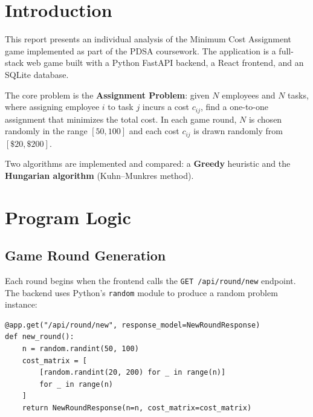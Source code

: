 \documentclass[12pt,a4paper]{article}
\begin{document}
\newpage
{}
\cfoot{\thepage}

\listoffigures
\newpage

\listoftables
\newpage

\tableofcontents
\newpage

\pagestyle{fancy}
\fancyhf{}
\renewcommand{\headrulewidth}{0pt}
\fancyfoot[R]{\thepage}

\section*{Introduction}

This report presents an individual analysis of the Minimum Cost Assignment game
implemented as part of the PDSA coursework. The application is a full-stack web
game built with a Python FastAPI backend, a React frontend, and an SQLite database.

The core problem is the \textbf{Assignment Problem}: given $N$ employees and $N$ tasks,
where assigning employee $i$ to task $j$ incurs a cost $c_{ij}$, find a one-to-one
assignment that minimizes the total cost. In each game round, $N$ is chosen randomly
in the range $[50, 100]$ and each cost $c_{ij}$ is drawn randomly from $[\$20, \$200]$.

Two algorithms are implemented and compared: a \textbf{Greedy} heuristic and the
\textbf{Hungarian algorithm} (Kuhn--Munkres method).

\clearpage
\section{Program Logic}

\subsection{Game Round Generation}

Each round begins when the frontend calls the \texttt{GET /api/round/new} endpoint.
The backend uses Python's \texttt{random} module to produce a random problem instance:

\needspace{7cm}
\begin{lstlisting}[caption={Game round generation -- backend/main.py}]
@app.get("/api/round/new", response_model=NewRoundResponse)
def new_round():
    n = random.randint(50, 100)
    cost_matrix = [
        [random.randint(20, 200) for _ in range(n)]
        for _ in range(n)
    ]
    return NewRoundResponse(n=n, cost_matrix=cost_matrix)
\end{lstlisting}
\end{document}
